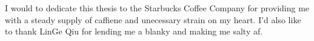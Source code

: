 I would to dedicate this thesis to the Starbucks Coffee Company for providing me with a steady supply of caffiene and unecessary strain on my heart. I'd also like to thank LinGe Qiu for lending me a blanky and making me salty af.